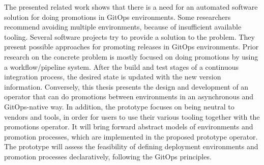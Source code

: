 The presented related work shows that there is a need for an automated software solution
for doing promotions in GitOps environments.
Some researchers recommend avoiding multiple environments,
because of insufficient available tooling.
Several software projects try to provide a solution to the problem.
They present possible approaches for promoting releases in GitOps environments.
%
Prior research on the concrete problem is mostly focused on
doing promotions by using a workflow/pipeline system.
After the build and test stages of a continuous integration process,
the desired state is updated with the new version information.
%
Conversely, this thesis presents the design and development
of an operator that can do promotions between environments
in an asynchronous and GitOps-native way.
In addition, the prototype focuses on being neutral to vendors
and tools, in order for users to use their various tooling
together with the promotions operator.
It will bring forward
abstract models of environments and promotion processes,
which are implemented in the proposed prototype operator.
The prototype will assess the feasibility of
defining deployment environments and promotion processes declaratively,
following the GitOps principles.









